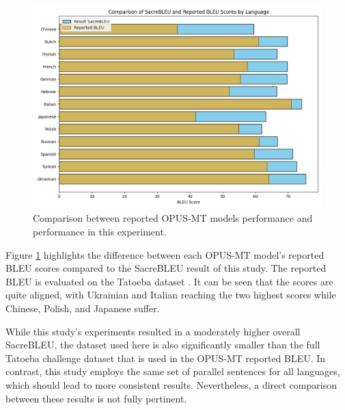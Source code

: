 \documentclass[a4paper, 11pt]{article}
\begin{document}
\begin{figure}[htbp]
    \centering
    \includegraphics[width=0.9\linewidth]{figures/opus_bleu_comparison.png}
    \caption{Comparison between reported OPUS-MT models performance and performance in this experiment.}
    \label{fig:opus_comparison}
\end{figure}

Figure \ref{fig:opus_comparison} highlights the difference between each OPUS-MT model's reported BLEU scores compared to the SacreBLEU result of this study. The reported BLEU is evaluated on the Tatoeba dataset \cite{tiedemann-2020-opus-mt}. It can be seen that the scores are quite aligned, with Ukrainian and Italian reaching the two highest scores while Chinese, Polish, and Japanese suffer.

While this study's experiments resulted in a moderately higher overall SacreBLEU, the dataset used here is also significantly smaller than the full Tatoeba challenge dataset \cite{tiedemann-2020-tatoeba-challenge} that is used in the OPUS-MT reported BLEU. In contrast, this study employs the same set of parallel sentences for all languages, which should lead to more consistent results. Nevertheless, a direct comparison between these results is not fully pertinent.
\end{document}
